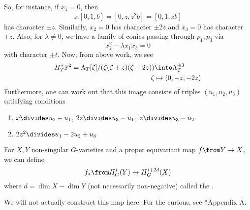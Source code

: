 \documentclass[11pt,leqno,oneside]{amsbook}
\renewcommand{\P}{\mathbb{P}}
\numberwithin{thm}{section}
\begin{document}
\begin{example}
\begin{enumerate}
    So, for instance, if \(x_1=0\), then \[
      z.[0,1,b] =[0,z,z^2b] = [0,1,zb]
    \]
    has character \(\pm z\). Similarly, \(x_2 = 0\) has character
    \(\pm 2z\) and \(x_3 = 0\) has character \(\pm z\). Also, for
    \(\lambda \neq 0\), we have a family of conics passing through
    \(p_1, p_3\) via \[
      x_2^2-\lambda x_1 x_3 = 0
    \]
    with character \(\pm t\). Now, from above work, we see
    \begin{align*}
      H_T^* \P^2 = \Lambda_T[\zeta]/(\zeta(\zeta+z)(\zeta+2z))
      & \into \Lambda_T^{\oplus 3} \\
      \zeta & \mapsto (0,-z,-2z)
    \end{align*}
    Furthermore, one can work out that this image consists of triples
    \((u_1,u_2,u_3)\) satisfying conditions
    \begin{enumerate}[label=(\roman*)]
    \item \(x \divides u_2-u_1\), \(2z \divides u_3-u_1\), \(z
      \divides u_3-u_2\)
    \item \(2z^2 \divides u_1-2u_2+u_3\)
    \end{enumerate}
  \end{enumerate}
\end{example}
\begin{defn}
  For \(X,Y\) non-singular \(G\)-varieties and a proper equivariant
  map \(f \from Y \to X\), we can define \[
    f_* \from H_G^i(Y) \to H_G^{i+2d}(X)
  \]
  where \(d = \dim X - \dim Y\) (not necessarily non-negative) called
  the .
\end{defn}
We will not actually construct this map here. For the curious, see
\cite{fulton}*{Appendix A}.
\end{document}
